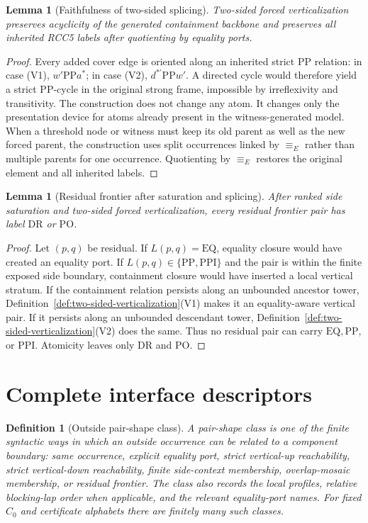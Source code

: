 \documentclass[11pt]{article}
\newtheorem{lemma}[theorem]{Lemma}
\newtheorem{definition}[theorem]{Definition}
\newcommand{\PP}{\mathrm{PP}}
\newcommand{\PPI}{\mathrm{PPI}}
\newcommand{\DR}{\mathrm{DR}}
\newcommand{\PO}{\mathrm{PO}}
\newcommand{\EQ}{\mathrm{EQ}}
\newcommand{\Eq}{\equiv_{\!E}}
\begin{document}
\begin{lemma}[Faithfulness of two-sided splicing]
\label{lem:splice-faithful}
Two-sided forced verticalization preserves acyclicity of the generated containment backbone and preserves all inherited RCC5 labels after quotienting by equality ports.
\end{lemma}

\begin{proof}
Every added cover edge is oriented along an inherited strict $\PP$ relation: in case (V1), $w'\PP a^*$; in case (V2), $d^{*'}\PP w'$.  A directed cycle would therefore yield a strict $\PP$-cycle in the original strong frame, impossible by irreflexivity and transitivity.  The construction does not change any atom.  It changes only the presentation device for atoms already present in the witness-generated model.  When a threshold node or witness must keep its old parent as well as the new forced parent, the construction uses split occurrences linked by $\Eq$ rather than multiple parents for one occurrence.  Quotienting by $\Eq$ restores the original element and all inherited labels.
\end{proof}

\begin{lemma}[Residual frontier after saturation and splicing]
\label{lem:residual-frontier}
After ranked side saturation and two-sided forced verticalization, every residual frontier pair has label $\DR$ or $\PO$.
\end{lemma}

\begin{proof}
Let $(p,q)$ be residual.  If $L(p,q)=\EQ$, equality closure would have created an equality port.  If $L(p,q)\in\{\PP,\PPI\}$ and the pair is within the finite exposed side boundary, containment closure would have inserted a local vertical stratum.  If the containment relation persists along an unbounded ancestor tower, Definition~\ref{def:two-sided-verticalization}(V1) makes it an equality-aware vertical pair.  If it persists along an unbounded descendant tower, Definition~\ref{def:two-sided-verticalization}(V2) does the same.  Thus no residual pair can carry $\EQ,\PP$, or $\PPI$.  Atomicity leaves only $\DR$ and $\PO$.
\end{proof}

\section{Complete interface descriptors}

\begin{definition}[Outside pair-shape class]
A pair-shape class is one of the finite syntactic ways in which an outside occurrence can be related to a component boundary: same occurrence, explicit equality port, strict vertical-up reachability, strict vertical-down reachability, finite side-context membership, overlap-mosaic membership, or residual frontier.  The class also records the local profiles, relative blocking-lap order when applicable, and the relevant equality-port names.  For fixed $C_0$ and certificate alphabets there are finitely many such classes.
\end{definition}
\end{document}
